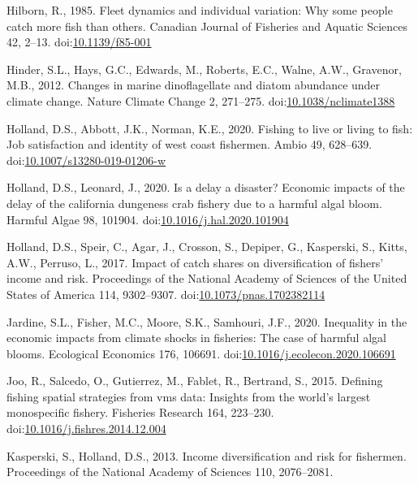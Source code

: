 \documentclass[]{elsarticle} %
\begin{document}
\leavevmode\hypertarget{ref-Hilborn1985}{}%
Hilborn, R., 1985. Fleet dynamics and individual variation: Why some
people catch more fish than others. Canadian Journal of Fisheries and
Aquatic Sciences 42, 2--13.
doi:\href{https://doi.org/10.1139/f85-001}{10.1139/f85-001}

\leavevmode\hypertarget{ref-Hinder2012}{}%
Hinder, S.L., Hays, G.C., Edwards, M., Roberts, E.C., Walne, A.W.,
Gravenor, M.B., 2012. Changes in marine dinoflagellate and diatom
abundance under climate change. Nature Climate Change 2, 271--275.
doi:\href{https://doi.org/10.1038/nclimate1388}{10.1038/nclimate1388}

\leavevmode\hypertarget{ref-Holland2020}{}%
Holland, D.S., Abbott, J.K., Norman, K.E., 2020. Fishing to live or
living to fish: Job satisfaction and identity of west coast fishermen.
Ambio 49, 628--639.
doi:\href{https://doi.org/10.1007/s13280-019-01206-w}{10.1007/s13280-019-01206-w}

\leavevmode\hypertarget{ref-Holland2020a}{}%
Holland, D.S., Leonard, J., 2020. Is a delay a disaster? Economic
impacts of the delay of the california dungeness crab fishery due to a
harmful algal bloom. Harmful Algae 98, 101904.
doi:\href{https://doi.org/10.1016/j.hal.2020.101904}{10.1016/j.hal.2020.101904}

\leavevmode\hypertarget{ref-Holland2017}{}%
Holland, D.S., Speir, C., Agar, J., Crosson, S., Depiper, G., Kasperski,
S., Kitts, A.W., Perruso, L., 2017. Impact of catch shares on
diversification of fishers' income and risk. Proceedings of the National
Academy of Sciences of the United States of America 114, 9302--9307.
doi:\href{https://doi.org/10.1073/pnas.1702382114}{10.1073/pnas.1702382114}

\leavevmode\hypertarget{ref-Jardine2020}{}%
Jardine, S.L., Fisher, M.C., Moore, S.K., Samhouri, J.F., 2020.
Inequality in the economic impacts from climate shocks in fisheries: The
case of harmful algal blooms. Ecological Economics 176, 106691.
doi:\href{https://doi.org/10.1016/j.ecolecon.2020.106691}{10.1016/j.ecolecon.2020.106691}

\leavevmode\hypertarget{ref-Joo2015}{}%
Joo, R., Salcedo, O., Gutierrez, M., Fablet, R., Bertrand, S., 2015.
Defining fishing spatial strategies from vms data: Insights from the
world's largest monospecific fishery. Fisheries Research 164, 223--230.
doi:\href{https://doi.org/10.1016/j.fishres.2014.12.004}{10.1016/j.fishres.2014.12.004}

\leavevmode\hypertarget{ref-Kasperski2013}{}%
Kasperski, S., Holland, D.S., 2013. Income diversification and risk for
fishermen. Proceedings of the National Academy of Sciences 110,
2076--2081.
\end{document}
